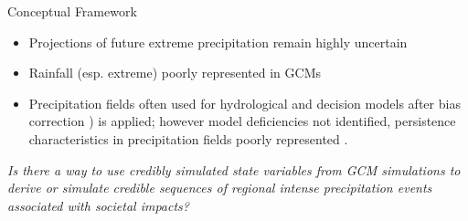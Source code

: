\begin{block}{Conceptual Framework}
    \begin{itemize}
      \item Projections of future extreme precipitation remain highly uncertain \citep{IPCC2012}
      \item Rainfall (esp. extreme) poorly represented in GCMs \citep[\ie][]{Kendon2012}
      \item Precipitation fields often used for hydrological and decision models after bias correction \citep[e.g. quantile-quantile mapping][]{Gudmundsson2012}) is applied; however model deficiencies not identified, persistence characteristics in precipitation fields poorly represented \citep[e.g.][]{Piani2010}.
    \end{itemize}
    \emph{Is there a way to use credibly simulated state variables from GCM simulations to derive or simulate credible sequences of regional intense precipitation events associated with societal impacts?}
\end{block}
